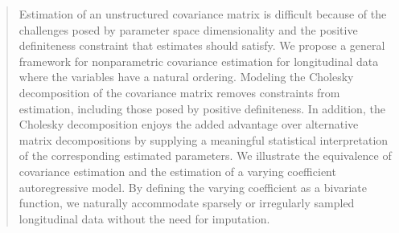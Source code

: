 

\begin{quote}
%
%
\doublespacing
Estimation of an unstructured covariance matrix is difficult because of the challenges posed by parameter space dimensionality and the positive definiteness constraint that estimates should satisfy. We propose a general framework for nonparametric covariance estimation for longitudinal data where the variables have a natural ordering. Modeling the Cholesky decomposition of the covariance matrix removes constraints from estimation, including those posed by positive definiteness. In addition, the Cholesky decomposition enjoys the added advantage over alternative matrix decompositions by supplying a meaningful statistical interpretation of the corresponding estimated parameters. We illustrate the equivalence of covariance estimation and the estimation of a varying coefficient autoregressive model. By defining the varying coefficient as a bivariate function, we naturally accommodate sparsely or irregularly sampled longitudinal data without the need for imputation. 

\bigskip


\end{quote}
